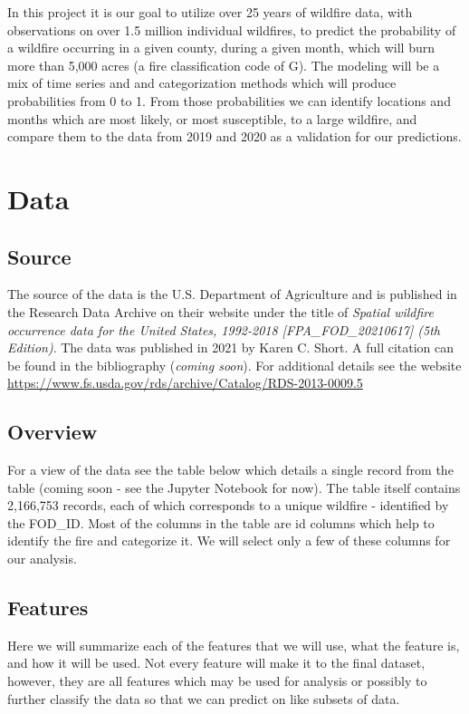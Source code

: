 \documentclass[12pt]{article}
\begin{document}
In this project it is our goal to utilize over 25 years of wildfire data, with observations on over 1.5 million individual wildfires, to predict the probability of a wildfire occurring in a given county, during a given month, which will burn more than 5,000 acres (a fire classification code of G). The modeling will be a mix of time series and and categorization methods which will produce probabilities from 0 to 1. From those probabilities we can identify locations and months which are most likely, or most susceptible, to a large wildfire, and compare them to the data from 2019 and 2020 as a validation for our predictions. 

\section{\textrm{ \LARGE Data}} 

\subsection{\textrm{Source}}

The source of the data is the U.S. Department of Agriculture and is published in the Research Data Archive on their website under the title of \textit{Spatial wildfire occurrence data for the United States, 1992-2018 [FPA\_FOD\_20210617] (5th Edition)}. The data was published in 2021 by Karen C. Short. A full citation can be found in the bibliography (\textit{coming soon}). For additional details see the website \url{https://www.fs.usda.gov/rds/archive/Catalog/RDS-2013-0009.5}

\subsection{\textrm{Overview}} 

For a view of the data see the table below which details a single record from the table (coming soon - see the Jupyter Notebook for now). The table itself contains 2,166,753 records, each of which corresponds to a unique wildfire - identified by the FOD\_ID. Most of the columns in the table are id columns which help to identify the fire and categorize it. We will select only a few of these columns for our analysis. 

\subsection{\textrm{Features}}

Here we will summarize each of the features that we will use, what the feature is, and how it will be used. Not every feature will make it to the final dataset, however, they are all features which may be used for analysis or possibly to further classify the data so that we can predict on like subsets of data. 
\end{document}
